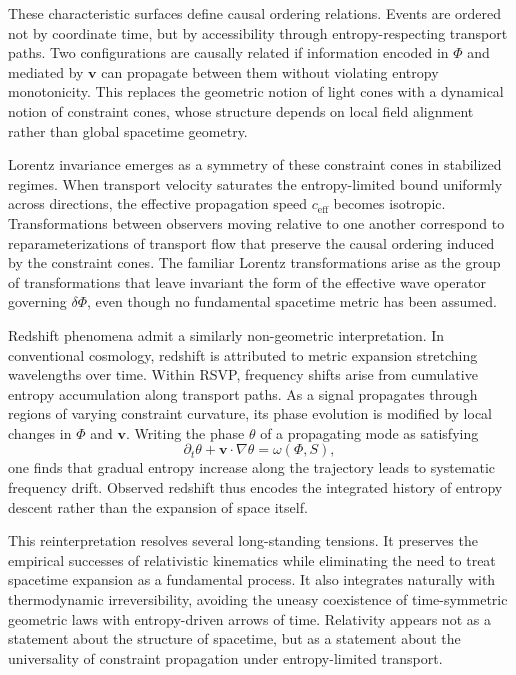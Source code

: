 \documentclass[11pt]{article}
\begin{document}
These characteristic surfaces define causal ordering relations. Events are ordered not by coordinate time, but by accessibility through entropy-respecting transport paths. Two configurations are causally related if information encoded in $\Phi$ and mediated by $\mathbf{v}$ can propagate between them without violating entropy monotonicity. This replaces the geometric notion of light cones with a dynamical notion of constraint cones, whose structure depends on local field alignment rather than global spacetime geometry.

Lorentz invariance emerges as a symmetry of these constraint cones in stabilized regimes. When transport velocity saturates the entropy-limited bound uniformly across directions, the effective propagation speed $c_{\text{eff}}$ becomes isotropic. Transformations between observers moving relative to one another correspond to reparameterizations of transport flow that preserve the causal ordering induced by the constraint cones. The familiar Lorentz transformations arise as the group of transformations that leave invariant the form of the effective wave operator governing $\delta \Phi$, even though no fundamental spacetime metric has been assumed.

Redshift phenomena admit a similarly non-geometric interpretation. In conventional cosmology, redshift is attributed to metric expansion stretching wavelengths over time. Within RSVP, frequency shifts arise from cumulative entropy accumulation along transport paths. As a signal propagates through regions of varying constraint curvature, its phase evolution is modified by local changes in $\Phi$ and $\mathbf{v}$. Writing the phase $\theta$ of a propagating mode as satisfying
\begin{equation}
\partial_t \theta + \mathbf{v} \cdot \nabla \theta = \omega(\Phi, S),
\end{equation}
one finds that gradual entropy increase along the trajectory leads to systematic frequency drift. Observed redshift thus encodes the integrated history of entropy descent rather than the expansion of space itself.

This reinterpretation resolves several long-standing tensions. It preserves the empirical successes of relativistic kinematics while eliminating the need to treat spacetime expansion as a fundamental process. It also integrates naturally with thermodynamic irreversibility, avoiding the uneasy coexistence of time-symmetric geometric laws with entropy-driven arrows of time. Relativity appears not as a statement about the structure of spacetime, but as a statement about the universality of constraint propagation under entropy-limited transport.
\end{document}

